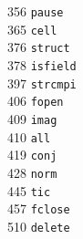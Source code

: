 \begin{footnotesize}
\begin{multicols}{3}
\vspace{-.153cm} 356   \hspace{.2cm} {\tt pause               }     \\ %
\vspace{-.153cm} 365   \hspace{.2cm} {\tt cell                }     \\ %
\vspace{-.153cm} 376   \hspace{.2cm} {\tt struct              }     \\ %
\vspace{-.153cm} 378   \hspace{.2cm} {\tt isfield             }     \\ %
\vspace{-.153cm} 397   \hspace{.2cm} {\tt strcmpi             }     \\ %
\vspace{-.153cm} 406   \hspace{.2cm} {\tt fopen               }     \\ %
\vspace{-.153cm} 409   \hspace{.2cm} {\tt imag                }     \\ %
\vspace{-.153cm} 410   \hspace{.2cm} {\tt all                 }     \\ %
\vspace{-.153cm} 419   \hspace{.2cm} {\tt conj                }     \\ %
\vspace{-.153cm} 428   \hspace{.2cm} {\tt norm                }     \\ %
\vspace{-.153cm} 445   \hspace{.2cm} {\tt tic                 }     \\ %
\vspace{-.153cm} 457   \hspace{.2cm} {\tt fclose              }     \\ %
\vspace{-.153cm} 510   \hspace{.2cm} {\tt delete              }     \\ %

\end{multicols}
\end{footnotesize}
